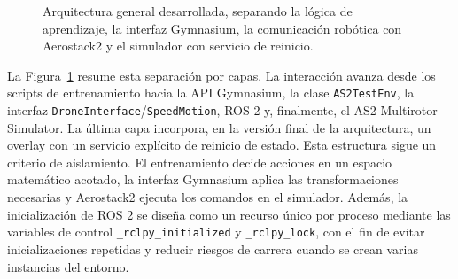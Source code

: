 \begin{figure}[t]
\centering
\shorthandoff{<>}
\shorthandon{<>}
\caption{Arquitectura general desarrollada, separando la lógica de aprendizaje,
la interfaz Gymnasium, la comunicación robótica con Aerostack2 y el simulador
con servicio de reinicio.}
\label{fig:diseno:arquitectura_general}
\end{figure}

La Figura~\ref{fig:diseno:arquitectura_general} resume esta separación por
capas. La interacción avanza desde los scripts de entrenamiento hacia la API
Gymnasium, la clase \texttt{AS2TestEnv}, la interfaz
\texttt{DroneInterface}/\texttt{SpeedMotion}, ROS 2 y, finalmente, el AS2
Multirotor Simulator. La última capa incorpora, en la versión final de la arquitectura,
un overlay con un servicio explícito de reinicio de estado. Esta estructura sigue
un criterio de aislamiento. El entrenamiento decide acciones en un espacio
matemático acotado, la interfaz Gymnasium aplica las transformaciones necesarias y
Aerostack2 ejecuta los comandos en el simulador. Además, la inicialización de ROS
2 se diseña como un recurso único por proceso mediante las variables de control
\texttt{\_rclpy\_initialized} y \texttt{\_rclpy\_lock}, con el fin de evitar
inicializaciones repetidas y reducir riesgos de carrera cuando se crean varias
instancias del entorno.

